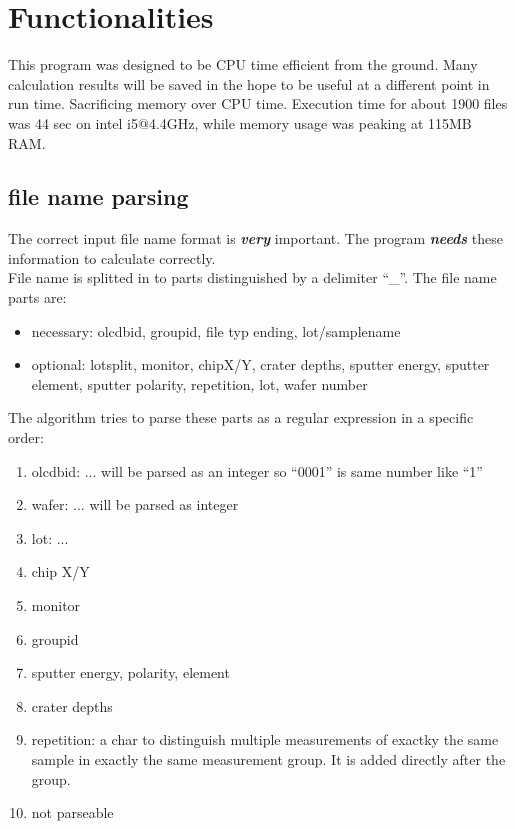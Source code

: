 \documentclass[a4paper,10pt]{article}
\begin{document}
\section{Functionalities}
This program was designed to be CPU time efficient from the ground. Many calculation results will be saved in the hope to be useful at a different point in run time. Sacrificing memory over CPU time. Execution time for about 1900 files was 44 sec on intel i5@4.4GHz, while memory usage was peaking at 115MB RAM.
\subsection{file name parsing}
The correct input file name format is \textbf{\textit{very}} important. The program \textbf{\textit{needs}} these information to calculate correctly. \\
File name is splitted in to parts distinguished by a delimiter ``\_''. The file name parts are:
\begin{itemize} 
 \item necessary: olcdbid, groupid, file typ ending, lot/samplename
 \item optional: lotsplit, monitor, chipX/Y, crater depths, sputter energy, sputter element, sputter polarity, repetition, lot, wafer number
\end{itemize}
The algorithm tries to parse these parts as a regular expression in a specific order:
\begin{enumerate}
 \item olcdbid: ... will be parsed as an integer so ``0001'' is same number like ``1''
 \item wafer: ... will be parsed as integer
 \item lot: ...
 \item chip X/Y
 \item monitor
 \item groupid
 \item sputter energy, polarity, element
 \item crater depths
 \item repetition: a char to distinguish multiple measurements of exactky the same sample in exactly the same measurement group. It is added directly after the group. 
 \item not parseable
\end{enumerate}
\end{document}
